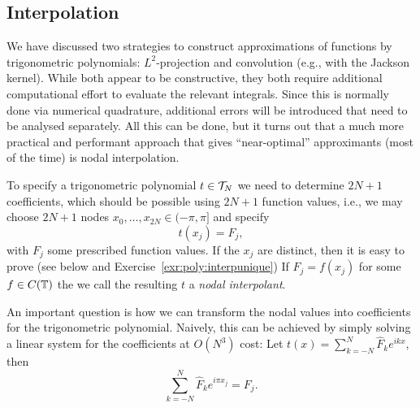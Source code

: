 \subsection{Interpolation}
%
\label{sec:trig:interp}
%
We have discussed two strategies to construct approximations of functions by
trigonometric polynomials: $L^2$-projection and convolution (e.g., with the
Jackson kernel). While both appear to be constructive, they both require additional
computational effort to evaluate the relevant integrals. Since this is normally
done via numerical quadrature, additional errors will be introduced that
need to be analysed separately. All this can be done, but it turns out that
a much more practical and performant approach that gives ``near-optimal''
approximants (most of the time) is nodal interpolation.

To specify a trigonometric polynomial $t \in \mathcal{T}_N$ we need to determine
$2N+1$ coefficients, which should be possible using $2N+1$ function values,
i.e., we may choose $2N+1$ nodes $x_0, \dots, x_{2N} \in (-\pi, \pi]$
and specify
\[
    t(x_j) = F_j,
\]
with $F_j$ some prescribed function values. If the $x_j$ are distinct, then it
is easy to prove (see below and Exercise~\ref{exr:poly:interpunique}) If $F_j =
f(x_j)$ for some $f \in C(\mathbb{T})$ the we call the resulting $t$ a {\em nodal
interpolant}.

An important question is how we can transform the nodal values into coefficients
for the trigonometric polynomial. Naively, this can be achieved by simply
solving a linear system for the coefficients at $O(N^3)$ cost:
Let $t(x) = \sum_{k = -N}^N \hat{F}_k e^{ik x}$, then
\begin{equation} \label{eq:trig:pre-dft}
  \sum_{k = -N}^N \hat{F}_k e^{i\pi x_j} = F_j.
\end{equation}



